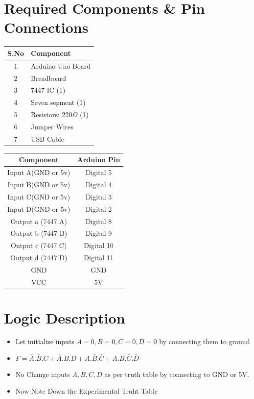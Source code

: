 \documentclass[a4paper,12pt]{article}
\begin{document}
\section*{Required Components \& Pin Connections}
\begin{center}
\begin{minipage}{0.45\textwidth}
\begin{table}[H]
\centering
\begin{tabular}{|c|l|}
\hline
\textbf{S.No} & \textbf{Component} \\ \hline
1 & Arduino Uno Board \\
2 & Breadboard \\
3 & 7447 IC (1) \\
4 & Seven segment (1) \\
5 & Resistors: 220$\Omega$ (1) \\
6 & Jumper Wires \\
7 & USB Cable \\
\hline
\end{tabular}
\end{table}
\end{minipage}
\hspace{0.05\textwidth}
\begin{minipage}{0.45\textwidth}
\begin{table}[H]
\centering
\begin{tabular}{|c|c|}
\hline
\textbf{Component} & \textbf{Arduino Pin} \\ \hline
Input A(GND or 5v) & Digital 5 \\
Input B(GND or 5v) & Digital 4 \\
Input C(GND or 5v) & Digital 3 \\
Input D(GND or 5v) & Digital 2 \\
Output a (7447 A) & Digital 8 \\
Output b (7447 B) & Digital 9 \\
Output c (7447 C) & Digital 10 \\
Output d (7447 D) & Digital 11 \\
GND & GND \\
VCC & 5V \\
\hline
\end{tabular}
\end{table}
\end{minipage}
\end{center}
\section*{Logic Description}
\begin{itemize}
        \item Let initialize inputs $A=0,B=0,C=0,D=0$ by connecting them to ground
        \item $F = \bar{A}.\bar{B}.C + \bar{A}.B.D + A.\bar{B}.\bar{C} + A.B.\bar{C}.\bar{D} $
	\item No Change inputs $A,B,C,D$ as per truth table by connecting to GND or 5V.
	\item Now Note Down the Experimental Truht Table
\end{itemize}
\end{document}
